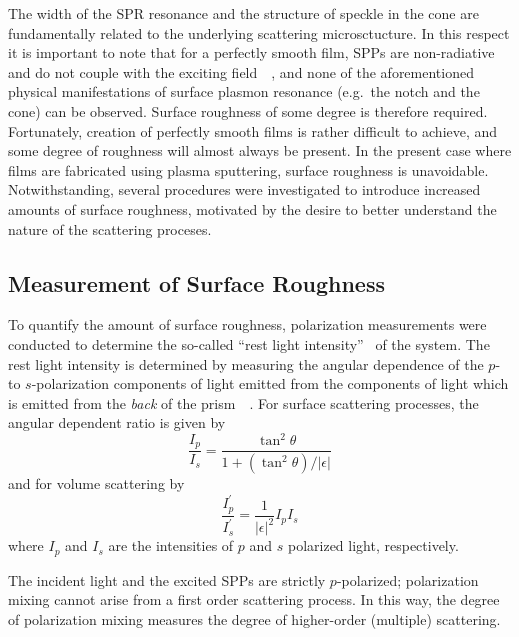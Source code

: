 The width of the SPR resonance and the structure of speckle in the cone are
fundamentally related to the underlying scattering microsctucture.  In this
respect it is important to note that for a perfectly smooth film, SPPs are
non-radiative and do not couple with the exciting
field~\cite{johansson1990theory}~\cite{otto1968excitation}, and none of the
aforementioned physical manifestations of surface plasmon resonance (e.g.\ the
notch and the cone) can be observed.  Surface roughness of some degree is
therefore required.  Fortunately, creation of perfectly smooth films is rather
difficult to achieve, and some degree of roughness will almost always be
present.  In the present case where films are fabricated using plasma
sputtering, surface roughness is unavoidable.  Notwithstanding, several
procedures were investigated to introduce increased amounts of surface
roughness, motivated by the desire to better understand the nature of the
scattering proceses.

\subsection{Measurement of Surface Roughness}
To quantify the amount of surface roughness, polarization measurements were
conducted to determine the so-called ``rest light
intensity''~\cite{horstmann1977multiple} of the system.  The rest light
intensity is determined by measuring the angular dependence of the $p$- to
$s$-polarization components of light emitted from the components of light
which is emitted from the \textit{back} of the
prism~\cite{kretschmann1972decay}~\cite{hornauer1976light}.  For surface scattering processes, the
angular dependent ratio is given by~\cite{kretschmann1972thesis}
\begin{equation}
\frac{I_p}{I_s} = \frac{\tan^2\theta}{1+(\tan^2\theta)/|\epsilon|}
\label{eqn:ipssurface}
\end{equation}
and for volume scattering by
\begin{equation}
\frac{I^\prime_p}{I^\prime_s} = \frac{1}{|\epsilon|^2} I_p I_s
\label{eqn:ipsvolume}
\end{equation}
where $I_p$ and $I_s$ are the intensities of $p$ and $s$ polarized light,
respectively.

The incident light and the excited SPPs are strictly $p$-polarized;
polarization mixing cannot arise from a first order scattering process.
In this way, the degree of polarization mixing measures the degree of
higher-order (multiple) scattering.

